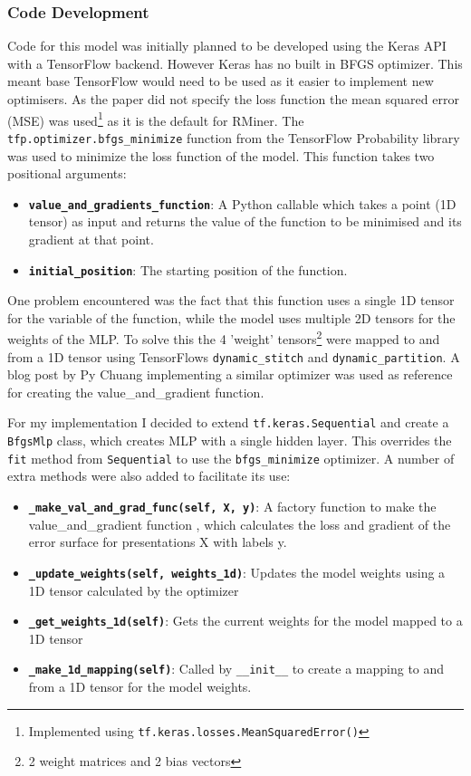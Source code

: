\documentclass[12pt,a4paper,titlepage,twoside]{report}
\begin{document}
\subsubsection*{Code Development}
	Code for this model was initially planned to be developed using the Keras API with a TensorFlow backend. However Keras has no built in BFGS optimizer. This meant base TensorFlow would need to be used as it easier to implement new optimisers. As the paper did not specify the loss function the mean squared error (MSE) was used\footnote{Implemented using \texttt{tf.keras.losses.MeanSquaredError()}} as it is the default for RMiner. The \texttt{tfp.optimizer.bfgs_minimize} function from the TensorFlow Probability library was used to minimize the loss function of the model. This function takes two positional arguments:
	\begin{itemize}
	\item \textbf{\texttt{value_and_gradients_function}}: A Python callable which takes a point (1D tensor) as input and returns the value of the function to be minimised and its gradient at that point.
	\item \textbf{\texttt{initial_position}}: The starting position of the function.
	\end{itemize}	
	One problem encountered was the fact that this function uses a single 1D tensor for the variable of the function, while the model uses multiple 2D tensors for the weights of the MLP. To solve this the 4 'weight' tensors\footnote{2 weight matrices  and 2 bias vectors} were mapped to and from a 1D tensor using TensorFlows \texttt{dynamic_stitch} and \texttt{dynamic_partition}. A blog post by Py Chuang implementing a similar optimizer was used as reference\cite{pychoa-optimizer} for creating the value_and_gradient function. \par
	For my implementation I decided to extend \texttt{tf.keras.Sequential} and create a \texttt{BfgsMlp} class, which creates MLP with a single hidden layer. This overrides the \texttt{fit} method from \texttt{Sequential} to use the \texttt{bfgs_minimize} optimizer. A number of extra methods were also added to facilitate its use:
	\begin{itemize}
	\item \textbf{\texttt{_make_val_and_grad_func(self, X, y)}}: A factory function to make the value_and_gradient function , which calculates the loss and gradient of the error surface for presentations X with labels y.
	\item \textbf{\texttt{_update_weights(self, weights_1d)}}: Updates the model weights using a 1D tensor calculated by the optimizer
	\item \textbf{\texttt{_get_weights_1d(self)}}: Gets the current weights for the model mapped to a 1D tensor
	\item \textbf{\texttt{_make_1d_mapping(self)}}: Called by \texttt{__init__} to create a mapping to and from a 1D tensor for the model weights.
	\end{itemize}
\end{document}
